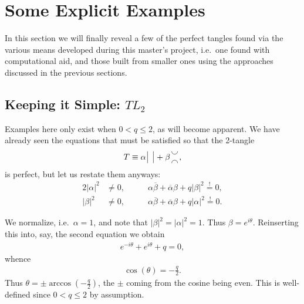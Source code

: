 \section{Some Explicit Examples}\label{section:EXAMPLES}
In this section we will finally reveal a few of the perfect tangles found via the various means developed during this master's project, i.e.\ one found with computational aid, and those built from smaller ones using the approaches discussed in the previous sections.

\subsection*{Keeping it Simple: \texorpdfstring{$TL_2$}{TL}}
Examples here only exist when $0< q \leq 2$, as will become apparent. We have already seen the equations that must be satisfied so that the 2-tangle 
\begin{align*}
T \equiv \alpha\,  \tikz[scale=0.5, baseline=-1mm]{\foreach \x in {0, 0.5} \draw (\x, -0.5) -- (\x, 0.5);}
 \,+\beta\, \tikz[scale=0.5, baseline=-1mm]{\draw (0, 0.5) arc[start angle=-180, end angle=0, radius=2.5mm]; \draw (0, -0.5) arc[start angle=180, end angle=0, radius=2.5mm];}\,,
\end{align*}
is perfect, but let us restate them anyways:
\begin{alignat*}{2}
\lvert \alpha \rvert^2 &\neq 0, \qquad &
\alpha \overline{\beta} + \overline{\alpha}\beta + q\lvert \beta \rvert^2 \overset{!}{=}0, \\
\lvert \beta \rvert^2 &\neq 0,\qquad &
\alpha \overline{\beta} + \overline{\alpha}\beta + q\lvert \alpha \rvert^2 \overset{!}{=}0.
\end{alignat*}

We normalize, i.e.\ $\alpha = 1$, and note that $\lvert \beta \rvert^2 =\lvert \alpha \rvert^2 = 1$. Thus $\beta = e^{i\theta}$. Reinserting this into, say, the second equation we obtain
\begin{align*}
e^{-i\theta} + e^{i\theta}  + q = 0,
\end{align*}
whence
\begin{align*}
\cos(\theta) = -\frac{q}{2}.
\end{align*}
Thus $\theta = \pm \arccos\left(-\frac{q}{2}\right)$, the $\pm$ coming from the cosine being even. This is well-defined since $0<q\leq 2$ by assumption. 

